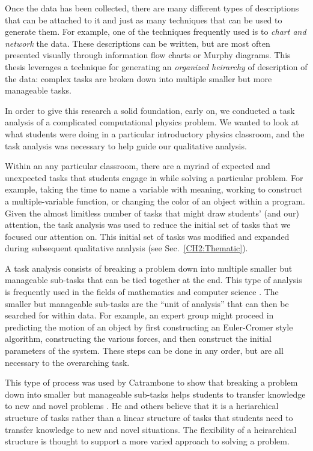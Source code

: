 \documentclass{msuphddissertation}
\begin{document}
\begin{doublespace}
Once the data has been collected, there are many different types of descriptions that can be attached to it and just as many techniques that can be used to generate them.  For example, one of the techniques frequently used is to \textit{chart and network} the data.  These descriptions can be written, but are most often presented visually through information flow charts or Murphy diagrams.  This thesis leverages a technique for generating an \textit{organized heirarchy} of description of the data: complex tasks are broken down into multiple smaller but more manageable tasks.

In order to give this research a solid foundation, early on, we conducted a task analysis of a complicated computational physics problem.  We wanted to look at what students were doing in a particular introductory physics classroom, and the task analysis was necessary to help guide our qualitative analysis.

Within an any particular classroom, there are a myriad of expected and unexpected tasks that students engage in while solving a particular problem.  For example, taking the time to name a variable with meaning, working to construct a multiple-variable function, or changing the color of an object within a program.  Given the almost limitless number of tasks that might draw students' (and our) attention, the task analysis was used to reduce the initial set of tasks that we focused our attention on.  This initial set of tasks was modified and expanded during subsequent qualitative analysis (see Sec.~\ref{CH2:Thematic}).

A task analysis consists of breaking a problem down into multiple smaller but manageable sub-tasks that can be tied together at the end.  This type of analysis is frequently used in the fields of mathematics and computer science \cite{Catrambone1998,Chandra1990,Fitzgerald2008,Ahmadzedah2005}.  The smaller but manageable sub-tasks are the ``unit of analysis'' that can then be searched for within data.  For example, an expert group might proceed in predicting the motion of an object by first constructing an Euler-Cromer style algorithm, constructing the various forces, and then construct the initial parameters of the system.  These steps can be done in any order, but are all necessary to the overarching task.

This type of process was used by Catrambone to show that breaking a problem down into smaller but manageable sub-tasks helps students to transfer knowledge to new and novel problems \cite{Catrambone1998}.  He and others believe that it is a heriarchical structure of tasks rather than a linear structure of tasks that students need to transfer knowledge to new and novel situations.  The flexibility of a heirarchical structure is thought to support a more varied approach to solving a problem.


\end{doublespace}
\end{document}
